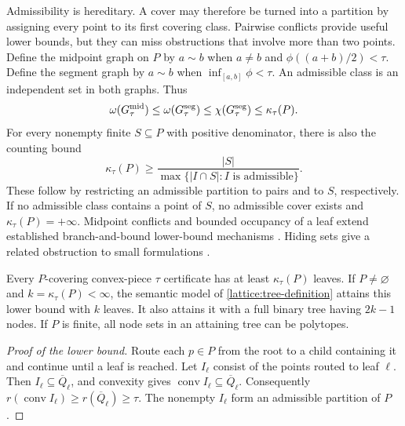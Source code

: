 Admissibility is hereditary. A cover may therefore be turned into a
partition by assigning every point to its first covering class. Pairwise
conflicts provide useful lower bounds, but they can miss obstructions that
involve more than two points. Define the midpoint graph on $P$ by
$a\sim b$ when $a\ne b$ and $\phi((a+b)/2)<\tau$. Define the segment graph
by $a\sim b$ when $\inf_{[a,b]}\phi<\tau$. An admissible class is an
independent set in both graphs. Thus
\begin{equation}
 \omega(G^{\rm mid}_\tau)\le\omega(G^{\rm seg}_\tau)
 \le\chi(G^{\rm seg}_\tau)\le\kappa_\tau(P).
 \label{lattice:graph-bound}
\end{equation}
For every nonempty finite $S\subseteq P$ with positive denominator, there
is also the counting bound
\begin{equation}
 \kappa_\tau(P)\ge
 \frac{|S|}{\max\{|I\cap S|:I\text{ is admissible}\}}.
 \label{lattice:count-bound}
\end{equation}
These follow by restricting an admissible partition to pairs and to $S$,
respectively. If no admissible class contains a point of $S$, no admissible
cover exists and $\kappa_\tau(P)=+\infty$. Midpoint conflicts and bounded
occupancy of a leaf extend established branch-and-bound lower-bound
mechanisms \citep{deyDubeyMolinaro2023BranchAndBoundLowerBounds}. Hiding
sets give a related obstruction to small formulations
\citep{kaibelWeltge2015LowerBoundsBranchAndBound}.

\begin{theorem}
\label{lattice:class-number}
Every $P$-covering convex-piece $\tau$ certificate has at least
$\kappa_\tau(P)$ leaves. If $P\ne\varnothing$ and
$k=\kappa_\tau(P)<\infty$, the semantic model of
\cref{lattice:tree-definition} attains this lower bound with $k$ leaves.
It also attains it with a full binary tree having $2k-1$ nodes. If $P$ is
finite, all node sets in an attaining tree can be polytopes.
\end{theorem}

\begin{proof}[Proof of the lower bound]
Route each $p\in P$ from the root to a child containing it and continue
until a leaf is reached. Let $I_\ell$ consist of the points routed to leaf
$\ell$. Then $I_\ell\subseteq\overline Q_\ell$, and convexity gives
$\operatorname{conv}I_\ell\subseteq\overline Q_\ell$. Consequently
$r(\operatorname{conv}I_\ell)\ge r(\overline Q_\ell)\ge\tau$. The nonempty
$I_\ell$ form an admissible partition of $P$.
\end{proof}

